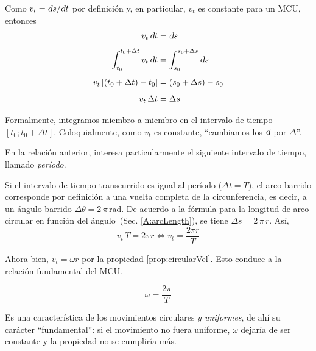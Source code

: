 Como $v_t = \textsl{d} s / \textsl{d} t$ por definición y, en particular, $v_t$ es constante para un MCU, entonces
\begin{align*}
    v_t \, \textsl{d} t &= \textsl{d} s
    \\[1ex]
    \int_{t_0}^{t_0+\Delta t} v_t \, \textsl{d} t &= \int_{s_0}^{s_0+\Delta s} \textsl{d} s
    \\[1ex]
    v_t \left[\left( t_0+\Delta t \right) - t_0\right] &= \left( s_0+\Delta s \right) - s_0
    \\[1ex]
    v_t \, \Delta t &= \Delta s
\end{align*}

Formalmente, integramos miembro a miembro en el intervalo de tiempo $\left[ t_0; t_0 + \Delta t \right]$.
Coloquialmente, como $v_t$ es constante, ``cambiamos los $\textsl{d}$ por $\Delta$''.

En la relación anterior, interesa particularmente el siguiente intervalo de tiempo, llamado \emph{período}.

\begin{mdframed}[style=DefinitionFrame]
    \begin{defn}
    \end{defn}
\end{mdframed}

Si el intervalo de tiempo transcurrido es igual al período ($\Delta t = T$), el arco barrido corresponde por definición a una vuelta completa de la circunferencia, es decir, a un ángulo barrido $\Delta \theta = 2 \, \pi \, \si{\radian}$.
De acuerdo a la fórmula para la longitud de arco circular en función del ángulo~(Sec. \ref{A:arcLength}), se tiene $\Delta s = 2 \, \pi \, r$.
Así,
\[ v_t \, T = 2 \pi r \iff v_t = \frac{2 \pi r}{T} \]

Ahora bien, $v_t = \omega r$ por la propiedad \ref{prop:circularVel}.
Esto conduce a la relación fundamental del MCU.

\begin{mdframed}[style=PropertyFrame]
    \begin{prop}
        \label{prop:period}
    \end{prop}
    \begin{equation*}
        \omega = \frac{2 \pi}{T}
    \end{equation*}
\end{mdframed}

Es una característica de los movimientos circulares \emph{y uniformes}, de ahí su carácter ``fundamental'':
si el movimiento no fuera uniforme, $\omega$ dejaría de ser constante y la propiedad no se cumpliría más.

